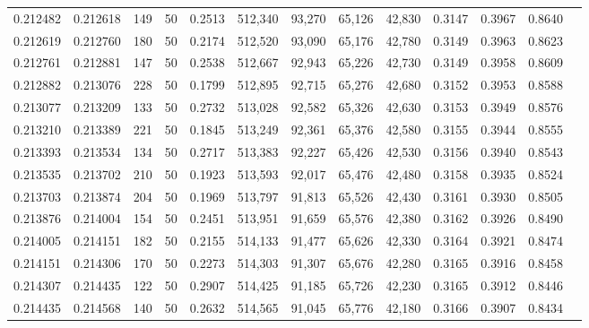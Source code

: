 \begin{tabular}{rrrrrrrrrrrrr}
0.212482 & 0.212618 &   149 &  50 &                                     0.2513 & 512,340 &  93,270 &  65,126 &  42,830 & 0.3147 & 0.3967 & 0.8640 \\
0.212619 & 0.212760 &   180 &  50 &                                     0.2174 & 512,520 &  93,090 &  65,176 &  42,780 & 0.3149 & 0.3963 & 0.8623 \\
0.212761 & 0.212881 &   147 &  50 &                                     0.2538 & 512,667 &  92,943 &  65,226 &  42,730 & 0.3149 & 0.3958 & 0.8609 \\
0.212882 & 0.213076 &   228 &  50 &                                     0.1799 & 512,895 &  92,715 &  65,276 &  42,680 & 0.3152 & 0.3953 & 0.8588 \\
0.213077 & 0.213209 &   133 &  50 &                                     0.2732 & 513,028 &  92,582 &  65,326 &  42,630 & 0.3153 & 0.3949 & 0.8576 \\
0.213210 & 0.213389 &   221 &  50 &                                     0.1845 & 513,249 &  92,361 &  65,376 &  42,580 & 0.3155 & 0.3944 & 0.8555 \\
0.213393 & 0.213534 &   134 &  50 &                                     0.2717 & 513,383 &  92,227 &  65,426 &  42,530 & 0.3156 & 0.3940 & 0.8543 \\
0.213535 & 0.213702 &   210 &  50 &                                     0.1923 & 513,593 &  92,017 &  65,476 &  42,480 & 0.3158 & 0.3935 & 0.8524 \\
0.213703 & 0.213874 &   204 &  50 &                                     0.1969 & 513,797 &  91,813 &  65,526 &  42,430 & 0.3161 & 0.3930 & 0.8505 \\
0.213876 & 0.214004 &   154 &  50 &                                     0.2451 & 513,951 &  91,659 &  65,576 &  42,380 & 0.3162 & 0.3926 & 0.8490 \\
0.214005 & 0.214151 &   182 &  50 &                                     0.2155 & 514,133 &  91,477 &  65,626 &  42,330 & 0.3164 & 0.3921 & 0.8474 \\
0.214151 & 0.214306 &   170 &  50 &                                     0.2273 & 514,303 &  91,307 &  65,676 &  42,280 & 0.3165 & 0.3916 & 0.8458 \\
0.214307 & 0.214435 &   122 &  50 &                                     0.2907 & 514,425 &  91,185 &  65,726 &  42,230 & 0.3165 & 0.3912 & 0.8446 \\
0.214435 & 0.214568 &   140 &  50 &                                     0.2632 & 514,565 &  91,045 &  65,776 &  42,180 & 0.3166 & 0.3907 & 0.8434 \\

\end{tabular}
